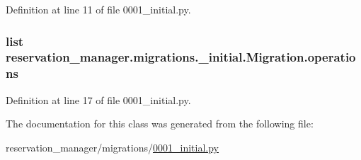 Definition at line 11 of file 0001\-\_\-initial.\-py.

\hypertarget{classreservation__manager_1_1migrations_1_10001__initial_1_1Migration_a6b2b9d5849cacfafc36325f1f2629f65}{
\subsubsection[{operations}]{\setlength{\rightskip}{0pt plus 5cm}list reservation\-\_\-manager.\-migrations.\-\_\-initial.\-Migration.\-operations\hspace{0.3cm}{\ttfamily [static]}}}\label{classreservation__manager_1_1migrations_1_10001__initial_1_1Migration_a6b2b9d5849cacfafc36325f1f2629f65}


Definition at line 17 of file 0001\-\_\-initial.\-py.



The documentation for this class was generated from the following file\-:\begin{DoxyCompactItemize}
\item 
reservation\-\_\-manager/migrations/\hyperlink{reservation__manager_2migrations_20001__initial_8py}{0001\-\_\-initial.\-py}\end{DoxyCompactItemize}
